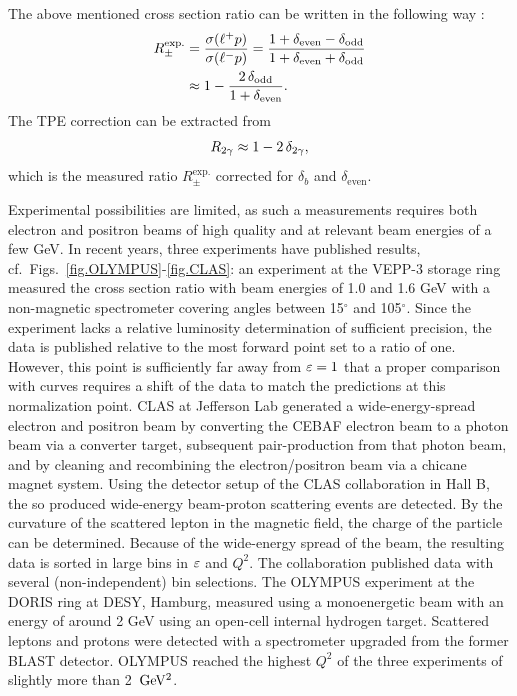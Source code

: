 The above mentioned cross section ratio can be written in the following way \cite{Afanasev:2017gsk}:
\begin{align}
    R_{\pm}^\text{exp.}&=\frac{\sigma(\ell ^+p)}{\sigma(\ell^-p)} = \frac{1+\delta_{\text{even}}-\delta_{\text{odd}}}{1+\delta_{\text{even}}+\delta_{\text{odd}}}\nonumber\\& \approx 1-\frac{2 \,\delta_{\text{odd}}}{1+\delta_{\text{even}}}.
\end{align}
The TPE correction can be extracted from 
\begin{equation}
\eqlab{R2gammadef}
       R_{2\gamma} \approx 1-2 \,\delta_{2\gamma},
\end{equation}
which is the 
measured ratio $R_{\pm}^\text{exp.}$ corrected for  $\delta_{b}$ and $\delta_{\text{even}}$.


Experimental possibilities are limited, as such a measurements requires both electron and positron beams of high quality and at relevant beam energies of a few GeV. In recent years, three experiments have published results, cf.\ Figs.~\ref{fig.OLYMPUS}-\ref{fig.CLAS}: an experiment \cite{Rachek:2014fam} at the VEPP-3 storage ring measured the cross section ratio with beam energies of 1.0 and 1.6 GeV with a non-magnetic spectrometer covering angles between 15$^\circ$ and 105$^\circ$. Since the experiment lacks a relative luminosity determination of sufficient precision, the data is published relative to the most forward point set to a ratio of one. However, this point is sufficiently far away from $\varepsilon=1$ that a proper comparison with curves requires a shift of the data to match the predictions at this normalization point. CLAS at Jefferson Lab \cite{CLAS:2013mza,CLAS:2014xso} generated a wide-energy-spread electron and positron beam by converting the CEBAF electron beam to a photon beam via a converter target, subsequent pair-production from that photon beam, and by cleaning and recombining the electron/positron beam via a chicane magnet system. Using the detector setup of the CLAS collaboration in Hall B, the so produced wide-energy beam-proton scattering events are detected. By the curvature of the scattered lepton in the magnetic field, the charge of the particle can be determined.  Because of the wide-energy spread of the beam, the resulting data is sorted in large bins in $\varepsilon$ and $Q^2$. The collaboration published data with several (non-independent) bin selections. The OLYMPUS experiment \cite{Henderson:2016dea} at the DORIS ring at DESY, Hamburg, measured using a monoenergetic beam with an energy of around 2 GeV using an open-cell internal hydrogen target. Scattered leptons and protons were detected with a spectrometer upgraded from the former BLAST detector. OLYMPUS reached the highest $Q^2$ of the three experiments of slightly more than 2~$\rm GeV^2$.


